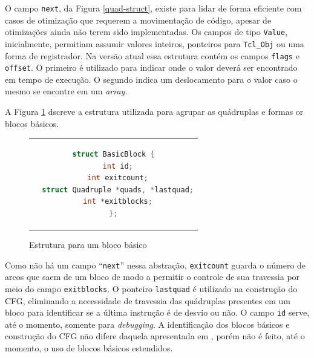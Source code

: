 O campo \verb!next!, da Figura \ref{quad-struct}, existe para
lidar de forma eficiente com casos de otimização que requerem a
movimentação de código, apesar de otimizações ainda não terem sido
implementadas. Os campos de tipo \verb!Value!,
inicialmente, permitiam assumir valores inteiros, ponteiros para
\verb!Tcl_Obj! ou uma forma de registrador. Na versão atual essa
estrutura contém os campos \verb!flags! e \verb!offset!. O
primeiro é utilizado para indicar onde o valor deverá
ser encontrado em tempo de execução. O segundo indica um deslocamento
para o valor caso o mesmo se encontre em um \textit{array}.

A Figura \ref{struct-bb} dscreve a estrutura utilizada para agrupar as
quádruplas e formas or blocos básicos.

\begin{figure}[h]
  \centering
  \begin{tabular}{c}
    \begin{lstlisting}[language=C]
struct BasicBlock {
  int id;
  int exitcount;
  struct Quadruple *quads, *lastquad;
  int *exitblocks;
};
    \end{lstlisting}
  \end{tabular}
  \caption{Estrutura para um bloco básico\label{struct-bb}}
\end{figure}

Como não há um campo ``\verb!next!'' nessa abstração, \verb!exitcount!
guarda o número de arcos que saem de um bloco de modo a
permitir o controle de sua travessia por meio do campo
\verb!exitblocks!. O ponteiro \verb!lastquad! é
utilizado na construção do CFG, eliminando a necessidade de travessia das
quádruplas presentes em um bloco para identificar se a última
instrução é de desvio ou não. O campo \verb!id! serve, até o momento,
somente para \textit{debugging}. A identificação dos blocos básicos e
construção do CFG não difere daquela apresentada em
, porém não é feito, até o momento, o
uso de blocos básicos estendidos.%

